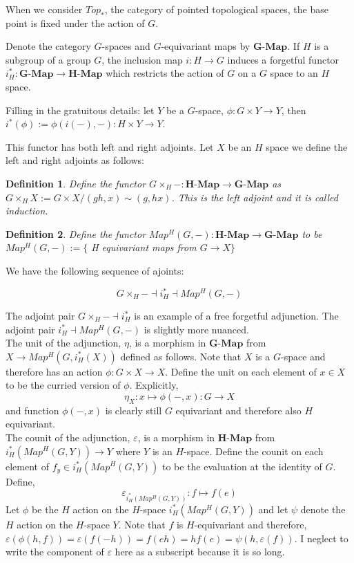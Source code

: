 \documentclass{article}
\theoremstyle{problemstyle}
\theoremstyle{problemstyle}
\newtheorem{definition}{Definition}
\theoremstyle{problemstyle}
\theoremstyle{problemstyle}
\theoremstyle{problemstyle}
\theoremstyle{problemstyle}
\begin{document}
When we consider $Top_{*}$, the category of pointed topological spaces, the base point is fixed under the action of $G$.

Denote the category $G$-spaces and $G$-equivariant maps by $\textbf{G-Map}$. If $H$ is a subgroup of a group $G$, the inclusion map $i:H \rightarrow G$ induces a forgetful functor $i^*_H:\textbf{G-Map} \rightarrow \textbf{H-Map}$ which restricts the action of $G$ on a $G$ space to an $H$ space.

Filling in the gratuitous details: let $Y$ be a $G$-space, $\phi:G\times Y\rightarrow Y$, then $i^*(\phi) := \phi(i(-),-):H \times Y \rightarrow Y$.

This functor has both left and right adjoints. Let $X$ be an $H$ space we define the left and right adjoints as follows:

\begin{definition}
Define the functor $G\times_H - : \textbf{H-Map} \rightarrow \textbf{G-Map}$ as $G\times_H X := G \times X / (gh,x) \sim (g,hx)$. This is the left adjoint and it is called induction.
\end{definition}

\begin{definition}
Define the functor $Map^H(G,-): \textbf{H-Map} \rightarrow \textbf{G-Map}$ to be $Map^H(G,-) := \{$ H equivariant maps from $G\rightarrow X\}$
\end{definition}

We have the following sequence of ajoints:

$$G\times_H - \dashv i^*_H \dashv Map^H(G,-)$$

The adjoint pair $G\times_H - \dashv i^*_H$ is an example of a free forgetful adjunction. The adjoint pair $i^*_H \dashv Map^H(G,-)$ is slightly more nuanced.\\

The unit of the adjunction, $\eta$, is a morphism in $\textbf{G-Map}$ from $X\rightarrow Map^H(G,i^*_H(X))$ defined as follows. Note that $X$ is a $G$-space and therefore has an action $\phi: G\times X \rightarrow X$. Define the unit on each element of $x \in X$ to be the curried version of $\phi$. Explicitly, $$\eta_X:x \mapsto \phi(-,x):G\rightarrow X$$ and function $\phi(-,x)$ is clearly still $G$ equivariant and therefore also $H$ equivariant. \\

The counit of the adjunction, $\varepsilon$, is a morphism in $\textbf{H-Map}$ from $i^*_H(Map^H(G,Y))\rightarrow Y$ where $Y$ is an $H$-space. Define the counit on each element of $f_y \in i^*_H(Map^H(G,Y))$ to be the evaluation at the identity of $G$. Define, $$\varepsilon_{i^*_H(Map^H(G,Y))}:f \mapsto f(e)$$ Let $\phi$ be the $H$ action on the $H$-space $i^*_H(Map^H(G,Y))$ and let $\psi$ denote the $H$ action on the $H$-space $Y$. Note that $f$ is $H$-equivariant and therefore, $\varepsilon(\phi(h,f)) =  \varepsilon(f(-h))= f(eh) = hf(e) = \psi(h,\varepsilon(f))$. I neglect to write the component of $\varepsilon$ here as a subscript because it is so long.  
\end{document}

